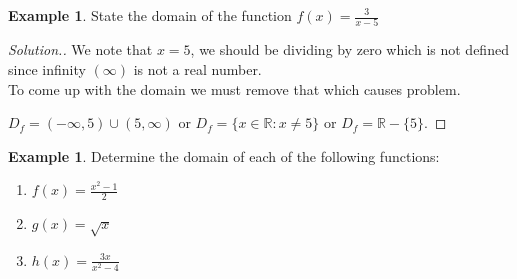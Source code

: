 \documentclass[11pt,a4paper]{article}
\theoremstyle{definition}
\newtheorem{example}[thm]{Example}
\newenvironment{solution}
  {\renewcommand{\qedsymbol}{}\begin{proof}[\textit{Solution}.]}
  {\end{proof}}
\begin{document}
\begin{example}

State the domain of the function $f(x)=\frac{3}{x-5}$
\end{example}
\begin{solution}

We note that $x=5$, we should be dividing by zero which is not defined since infinity $(\infty)$ is not a real number.\\ To come up with the domain we must remove that which causes problem.\\


\begin{figure}[H]
\centering
{}
\end{figure}

$D_f=(-\infty,5)\cup (5,\infty)$ or $D_f=\{x\in \mathbb{R}:x\neq 5\}$ or $D_f=\mathbb{R}-\{5\}$.
\end{solution}
\begin{example}

Determine the domain of each of the following functions:
\begin{enumerate}
\item $f(x)=\frac{x^2-1}{2}$
\item $g(x)=\sqrt{x}$
\item $h(x)=\frac{3x}{x^2-4}$
\end{enumerate}
\end{example}
\end{document}
